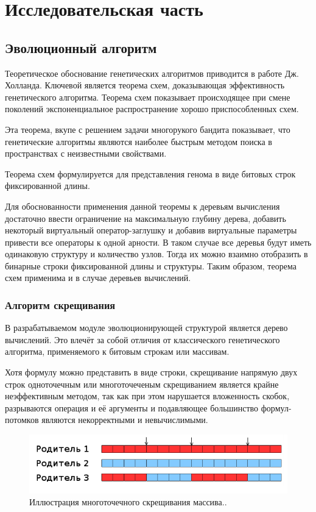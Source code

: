 \section{Исследовательская часть}

\subsection{Эволюционный алгоритм}

Теоретическое обоснование генетических алгоритмов приводится в работе Дж. Холланда. 
Ключевой является теорема схем, доказывающая эффективность генетического алгоритма. Теорема схем показывает происходящее при смене поколений экспоненциальное распространение хорошо приспособленных схем.

Эта теорема, вкупе с решением задачи многорукого бандита показывает, что генетические алгоритмы являются наиболее быстрым методом поиска в пространствах с неизвестными свойствами.

Теорема схем формулируется для представления генома в виде битовых строк фиксированной длины.

Для обоснованности применения данной теоремы к деревьям вычисления достаточно ввести ограничение на максимальную глубину дерева, добавить некоторый виртуальный оператор-заглушку и добавив виртуальные параметры привести все операторы к одной арности. В таком случае все деревья будут иметь одинаковую структуру и количество узлов. Тогда их можно взаимно отобразить в бинарные строки фиксированной длины и структуры. Таким образом, теорема схем применима и в случае деревьев вычислений.

\clearpage
\subsubsection{Алгоритм скрещивания} \label{sssec:crossover}
В разрабатываемом модуле эволюционирующей структурой является дерево вычислений. Это влечёт за собой отличия от классического генетического алгоритма, применяемого к битовым строкам или массивам.

Хотя формулу можно представить в виде строки, скрещивание напрямую двух строк одноточечным или многоточеченым скрещиванием является крайне неэффективным методом, так как при этом нарушается вложенность скобок, разрываются операция и её аргументы и подавляющее большинство формул-потомков являются некорректными и невычислимыми.

\begin{figure}[!h]
\centering
\includegraphics[scale=0.7]{research/pics/1.png}
\caption{Иллюстрация многоточечного скрещивания массива..}
\label{figure:arrayCrossover}
\end{figure}


